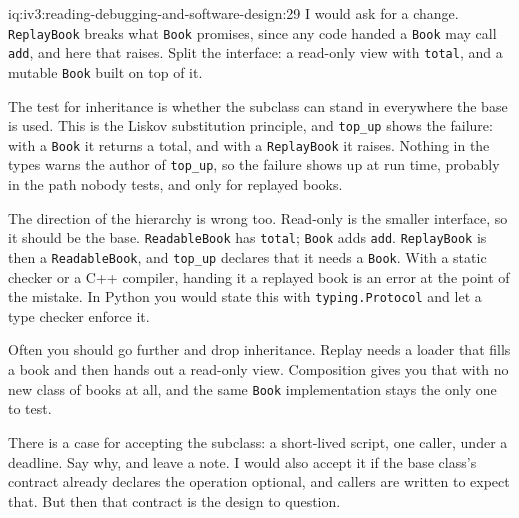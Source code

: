 \begin{solution}{iq:iv3:reading-debugging-and-software-design:29}
I would ask for a change. \texttt{ReplayBook} breaks what \texttt{Book} promises, since any code handed a \texttt{Book} may call \texttt{add}, and here that raises. Split the interface: a read-only view with \texttt{total}, and a mutable \texttt{Book} built on top of it.

The test for inheritance is whether the subclass can stand in everywhere the base is used. This is the Liskov substitution principle, and \texttt{top\_up} shows the failure: with a \texttt{Book} it returns a total, and with a \texttt{ReplayBook} it raises. Nothing in the types warns the author of \texttt{top\_up}, so the failure shows up at run time, probably in the path nobody tests, and only for replayed books.

The direction of the hierarchy is wrong too. Read-only is the smaller interface, so it should be the base. \texttt{ReadableBook} has \texttt{total}; \texttt{Book} adds \texttt{add}. \texttt{ReplayBook} is then a \texttt{ReadableBook}, and \texttt{top\_up} declares that it needs a \texttt{Book}. With a static checker or a C++ compiler, handing it a replayed book is an error at the point of the mistake. In Python you would state this with \texttt{typing.Protocol} and let a type checker enforce it.

Often you should go further and drop inheritance. Replay needs a loader that fills a book and then hands out a read-only view. Composition gives you that with no new class of books at all, and the same \texttt{Book} implementation stays the only one to test.

There is a case for accepting the subclass: a short-lived script, one caller, under a deadline. Say why, and leave a note. I would also accept it if the base class's contract already declares the operation optional, and callers are written to expect that. But then that contract is the design to question.


\end{solution}

